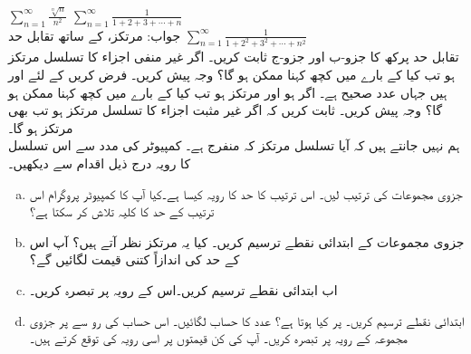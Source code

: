 $\sum\limits_{n=1}^{\infty}\frac{\sqrt[n]{n}}{n^2}$
$\sum\limits_{n=1}^{\infty}\frac{1}{1+2+3+\cdots+n}$\\
جواب:\quad
مرتکز،  کے ساتھ تقابل حد
$\sum\limits_{n=1}^{\infty}\frac{1}{1+2^2+3^2+\cdots+n^2}$
\\
تقابل حد پرکھ کا جزو-ب اور جزو-ج ثابت کریں۔ 
اگر غیر منفی اجزاء کا تسلسل  مرتکز ہو تب کیا  کے بارے میں کچھ کہنا ممکن ہو گا؟ وجہ پیش کریں۔
فرض کریں   کے لئے  اور  ہیں جہاں  عدد صحیح ہے۔ اگر  ہو اور  مرتکز ہو تب کیا  کے بارے میں کچھ کہنا ممکن ہو گا؟ وجہ پیش کریں۔
ثابت کریں کہ اگر غیر مثبت اجزاء کا تسلسل  مرتکز ہو تب  بھی مرتکز ہو گا۔
\\
ہم نہیں جانتے ہیں کہ آیا تسلسل  مرتکز کہ منفرج ہے۔ کمپیوٹر کی مدد سے اس تسلسل کا رویہ درج ذیل اقدام سے دیکھیں۔
\begin{enumerate}[a.]
\item
جزوی مجموعات  کی ترتیب لیں۔ اس ترتیب کا حد کا رویہ  کیسا ہے۔کیا آپ کا کمپیوٹر پروگرام اس ترتیب کے حد کا کلیہ تلاش کر سکتا ہے؟
\item
جزوی مجموعات کے ابتدائی  نقطے  ترسیم کریں۔  کیا یہ مرتکز نظر آتے ہیں؟ آپ اس کے حد کی اندازاً کتنی قیمت لگائیں گے؟
\item
اب ابتدائی  نقطے   ترسیم کریں۔اس کے رویہ پر تبصرہ کریں۔
\item
ابتدائی  نقطے   ترسیم کریں۔  پر کیا ہوتا ہے؟ عدد  کا حساب لگائیں۔ اس حساب کی رو سے  پر جزوی مجموعہ کے رویہ پر تبصرہ کریں۔ آپ  کی کن قیمتوں پر اسی رویہ کی توقع کرتے ہیں۔  
\end{enumerate}

